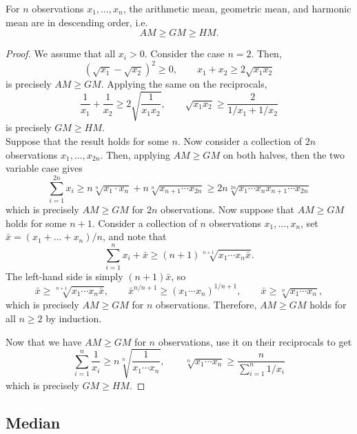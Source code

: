 \documentclass[11pt]{article}
\theoremstyle{definition}
\theoremstyle{remark}
\numberwithin{equation}{section}
\begin{document}
    \begin{theorem}
        For $n$ observations $x_1, \dots, x_n$, the arithmetic mean, geometric mean,
        and harmonic mean are in descending order, i.e.\ \[
            AM \geq GM \geq HM.
        \] 
    \end{theorem}
    \begin{proof}
        We assume that all $x_i > 0$. Consider the case $n = 2$. Then, \[
            (\sqrt{x_1} - \sqrt{x_2})^2 \geq 0, \qquad x_1 + x_2 \geq 2\sqrt{x_1 x_2}
        \] is precisely $AM \geq GM$. Applying the same on the reciprocals, \[
            \frac{1}{x_1} + \frac{1}{x_2} \geq 2\sqrt{\frac{1}{x_1 x_2}}, \qquad
            \sqrt{x_1 x_2} \geq \frac{2}{1 / x_1 + 1 / x_2}
        \] is precisely $GM \geq HM$. \\

        Suppose that the result holds for some $n$. Now consider a collection of $2n$
        observations $x_1, \dots, x_{2n}$. Then, applying $AM \geq GM$ on both
        halves, then the two variable case gives \[
            \sum_{i = 1}^{2n} x_i \geq n\sqrt[n]{x_1\cdot x_n} + n\sqrt[n]{x_{n + 1}\cdots
            x_{2n}} \geq 2n\sqrt[2n]{x_1\cdots x_n x_{n + 1}\cdots x_{2n}}
        \] which is precisely $AM \geq GM$ for $2n$ observations.  Now suppose that
        $AM \geq GM$ holds for some $n + 1$. Consider a collection of $n$
        observations $x_1, \dots, x_n$, set $\bar{x} = (x_1 + \dots + x_n) / n$, and
        note that \[
            \sum_{i = 1}^n x_i + \bar{x} \geq (n + 1)\sqrt[n + 1]{x_1\cdots x_n
            \bar{x}}.
        \] The left-hand side is simply $(n + 1)\bar{x}$, so \[
            \bar{x} \geq \sqrt[n + 1]{x_1\cdots x_n \bar{x}}, \qquad \bar{x}^{n / n +
            1} \geq (x_1\cdots x_n)^{1 / n + 1}, \qquad \bar{x} \geq
            \sqrt[n]{x_1\cdots x_n},
        \] which is precisely $AM \geq GM$ for $n$ observations. Therefore, $AM \geq
        GM$ holds for all $n \geq 2$ by induction.

        Now that we have $AM \geq GM$ for $n$ observations, use it on their
        reciprocals to get \[
            \sum_{i = 1}^n \frac{1}{x_i} \geq n\sqrt[n]{\frac{1}{x_1\cdots x_n}}, \qquad 
            \sqrt[n]{x_1\cdots x_n} \geq \frac{n}{\sum_{i = 1}^n 1 / x_i}
        \] which is precisely $GM \geq HM$.
    \end{proof}


    \subsection{Median}
    
\end{document}
